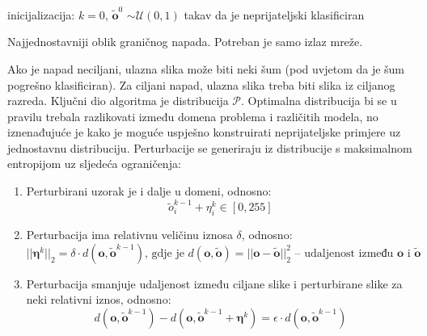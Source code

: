 \documentclass[utf8, diplomski]{fer}
\begin{document}
\begin{center}
\begin{algorithm}[H]
 inicijalizacija: $k=0$, $\boldsymbol{\tilde{o}}^{0}$ $\sim \mathcal{U}(0, 1)$ takav da je neprijateljski klasificiran\;
 \caption{Najjednostavniji oblik graničnog napada. Potreban je samo izlaz mreže.}\label{simple_boundary_alg}
\end{algorithm}
\end{center}
\par
Ako je napad neciljani, ulazna slika može biti neki šum (pod uvjetom da je šum pogrešno klasificiran). Za ciljani napad, ulazna slika treba biti slika iz ciljanog razreda. Ključni dio algoritma je distribucija $\mathcal{P}$. Optimalna distribucija bi se u pravilu trebala razlikovati između domena problema i različitih modela, no iznenađujuće je kako je moguće uspješno konstruirati neprijateljske primjere uz jednostavnu distribuciju. Perturbacije se generiraju iz distribucije s maksimalnom entropijom uz sljedeća ograničenja:
\begin{enumerate}
  \item Perturbirani uzorak je i dalje u domeni, odnosno:
  \begin{equation}\label{boundary_1_cond}
	\tilde{o}_{i}^{k-1} + \eta_{i}^{k} \in [0, 255]
	\end{equation}
  \item Perturbacija ima relativnu veličinu iznosa $\delta$, odnosno:
    \begin{equation}\label{boundary_2_cond}
	||\boldsymbol{\eta}^{k}||_{2} = \delta \cdot d(\boldsymbol{o}, \boldsymbol{\tilde{o}}^{k-1})\text{, gdje je }d(\boldsymbol{o}, \boldsymbol{\tilde{o}}) = ||\boldsymbol{o} - \boldsymbol{\tilde{o}}||_{2}^{2} \text{ -- udaljenost između }\boldsymbol{o}\text{ i } \boldsymbol{\tilde{o}}
	\end{equation}
	\item Perturbacija smanjuje udaljenost između ciljane slike i perturbirane slike za neki relativni iznos, odnosno:
    \begin{equation}\label{boundary_3_cond}
	d(\boldsymbol{o}, \boldsymbol{\tilde{o}}^{k-1}) - d(\boldsymbol{o}, \boldsymbol{\tilde{o}}^{k-1} + \boldsymbol{\eta}^{k}) = \epsilon \cdot d(\boldsymbol{o}, \boldsymbol{\tilde{o}}^{k-1})
	\end{equation}
\end{enumerate}
\end{document}
